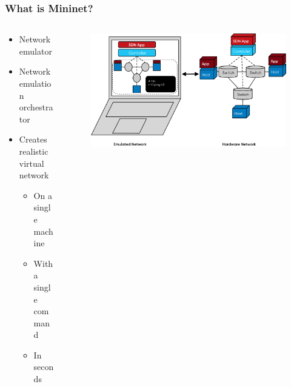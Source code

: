 \documentclass{beamer}
\begin{document}
\begin{frame}
  \frametitle{What is Mininet?}
  \begin{columns}
    \begin{column}{0.5\textwidth}
      \begin{itemize}
      \item[\ding{219}] Network emulator
      \item[\ding{219}] Network emulation orchestrator
      \item [\ding{219}] Creates realistic virtual network
      \begin{itemize}
      	\item [\ding{219}] On a single machine
      	\item [\ding{219}] With a single command
      	\item [\ding{219}] In seconds
      \end{itemize}
    \end{itemize}
    \end{column}
    \begin{column}{0.5\textwidth}
      \begin{figure}
        \centering
        \includegraphics[scale=0.145]{images/mininet-what-is-mininet.png}
      \end{figure}
    \end{column}
  \end{columns}
\end{frame}
\end{document}
